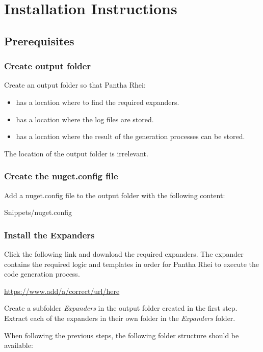 \chapter{Installation Instructions} \label{appendix:installation_instructions} 

\section{Prerequisites} \label{appendix:installation_prerequisits} 

\subsection*{Create output folder}
Create an output folder so that Pantha Rhei:
\begin{itemize}
    \item has a location where to find the required expanders.
    \item has a location where the log files are stored.
    \item has a location where the result of the generation processes can be stored.
\end{itemize}

The location of the output folder is irrelevant.

\subsection*{Create the nuget.config file}
Add a nuget.config file to the output folder with the following content:

    {Snippets/nuget.config}

\subsection*{Install the Expanders}
Click the following link and download the required expanders. The expander contains the
required logic and templates in order for Pantha Rhei to execute the code generation process.

\url{https://www.add/a/correct/url/here}

Create a subfolder \emph{Expanders} in the output folder created in the first step. Extract
each of the expanders in their own folder in the \emph{Expanders} folder.

When following the previous steps, the following folder structure should be available:

